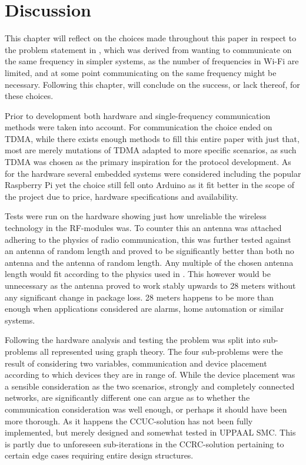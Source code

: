 \chapter{Discussion}\label{Discussion}
This chapter will reflect on the choices made throughout this paper in respect to the problem statement in , which was derived from wanting to communicate on the same frequency in simpler systems, as the number of frequencies in Wi-Fi are limited, and at some point communicating on the same frequency might be necessary.
Following this chapter,  will conclude on the success, or lack thereof, for these choices.

\bigskip \noindent
Prior to development both hardware and single-frequency communication methods were taken into account.
For communication the choice ended on TDMA, while there exists enough methods to fill this entire paper with just that, most are merely mutations of TDMA adapted to more specific scenarios, as such TDMA was chosen as the primary inspiration for the protocol development.
As for the hardware several embedded systems were considered including the popular Raspberry Pi yet the choice still fell onto Arduino as it fit better in the scope of the project due to price, hardware specifications and availability.

Tests were run on the hardware showing just how unreliable the wireless technology in the RF-modules was.
To counter this an antenna was attached adhering to the physics of radio communication, this was further tested against an antenna of random length and proved to be significantly better than both no antenna and the antenna of random length.
Any multiple of the chosen antenna length would fit according to the physics used in .
This however would be unnecessary as the antenna proved to work stably upwards to 28 meters without any significant change in package loss.
28 meters happens to be more than enough when applications considered are alarms, home automation or similar systems.

\bigskip \noindent
Following the hardware analysis and testing the problem was split into sub-problems all represented using graph theory.
The four sub-problems were the result of considering two variables, communication and device placement according to which devices they are in range of.
While the device placement was a sensible consideration as the two scenarios, strongly and completely connected networks, are significantly different one can argue as to whether the communication consideration was well enough, or perhaps it should have been more thorough.
As it happens the CCUC-solution has not been fully implemented, but merely designed and somewhat tested in UPPAAL SMC.
This is partly due to unforeseen sub-iterations in the CCRC-solution pertaining to certain edge cases requiring entire design structures.

